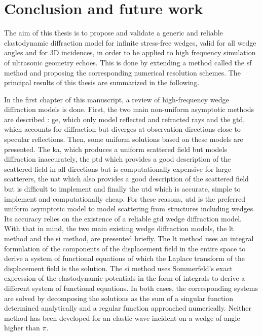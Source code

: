 \chapter*{Conclusion and future work}

The aim of this thesis is to propose and validate a generic and reliable elastodynamic diffraction model for infinite stress-free wedges, valid for all wedge angles and for 3D incidences, in order to be applied to high frequency simulation of ultrasonic geometry echoes. This is done by extending a method called the \acrfull{sf} method and proposing the corresponding numerical resolution schemes. The principal results of this thesis are summarized in the following.

In the first chapter of this manuscript, a review of high-frequency wedge diffraction models is done. First, the two main non-uniform asymptotic methods are described : \acrfull{ge}, which only model reflected and refracted rays and the \acrfull{gtd}, which accounts for diffraction but diverges at observation directions close to specular reflections. Then, some uniform solutions based on these models are presented. The \acrfull{ka}, which produces a uniform scattered field but models diffraction inaccurately, the \acrfull{ptd} which provides a good description of the scattered field in all directions but is computationally expensive for large scatterers, the \acrfull{uat} which also provides a good description of the scattered field but is difficult to implement and finally the \acrfull{utd} which is accurate, simple to implement and computationally cheap. For these reasons, \acrshort{utd} is the preferred uniform asymptotic model to model scattering from structures including wedges. Its accuracy relies on the existence of a reliable \acrshort{gtd} wedge diffraction model. With that in mind, the two main existing wedge diffraction models, the \acrfull{lt} method and the \acrfull{si} method, are presented briefly. The \acrshort{lt} method uses an integral formulation of the components of the displacement field in the entire space to derive a system of functional  equations of which the Laplace transform of the displacement field is the solution. The \acrshort{si} method uses Sommerfeld's exact expression of the elastodynamic potentials in the form of integrals to derive a different system of functional equations. In both cases, the corresponding systems are solved by decomposing the solutions as the sum of a singular function determined analytically and a regular function approached numerically. Neither method has been developed for an elastic wave incident on a wedge of angle higher than $\pi$.

